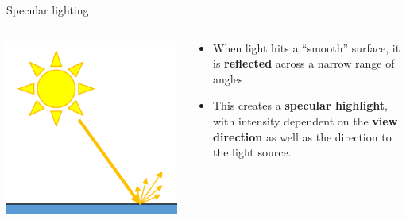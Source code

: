 \begin{frame}{Specular lighting}
	\pause
	\begin{columns}
		\begin{column}{0.33\textwidth}
			\includegraphics[width=\textwidth]{specular_1}
		\end{column}
		\begin{column}{0.65\textwidth}
			\begin{itemize}
				\pause\item When light hits a ``smooth'' surface, it is \textbf{reflected} across a narrow range of angles
				\pause\item This creates a \textbf{specular highlight}, with intensity dependent on the \textbf{view direction} as well as the direction to the light source.
			\end{itemize}
		\end{column}
	\end{columns}
\end{frame}

